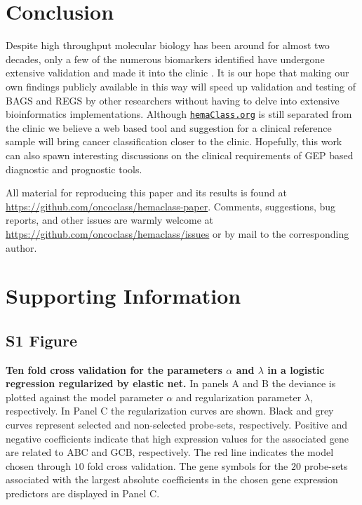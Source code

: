 \documentclass[10pt,letterpaper]{article}
\newcommand{\hemaClass}{\href{http://hemaClass.org}{\texttt{hemaClass.org}}}
\begin{document}
\section*{Conclusion}
Despite high throughput molecular biology has been around for almost two decades, only a few of the numerous biomarkers identified have undergone extensive validation and made it into the clinic \cite{Chen2012a}.
It is our hope that making our own findings publicly available in this way will speed up validation and testing of BAGS and REGS by other researchers without having to delve into extensive bioinformatics implementations.
Although \hemaClass{} is still separated from the clinic we believe a web based tool and suggestion for a clinical reference sample will bring cancer classification closer to the clinic.
Hopefully, this work can also spawn interesting discussions on the clinical requirements of GEP based diagnostic and prognostic tools.

All material for reproducing this paper and its results is found at \url{https://github.com/oncoclass/hemaclass-paper}.
Comments, suggestions, bug reports, and other issues are warmly welcome at \url{https://github.com/oncoclass/hemaclass/issues} or by mail to the corresponding author.

\section*{Supporting Information}

\setcounter{equation}{0}
\setcounter{figure}{0}
\setcounter{table}{0}

\renewcommand{\theequation}{S\arabic{equation}}
\renewcommand{\thefigure}{S\arabic{figure}}
\renewcommand{\thetable}{S\arabic{table}}
\renewcommand{\thesection}{S\arabic{section}}

\subsection*{S1 Figure}
\label{fig:crossval}
\textbf{Ten fold cross validation for the parameters $\alpha$ and $\lambda$ in a logistic regression regularized by elastic net.}
In panels A and B the deviance is plotted against the model parameter $\alpha$ and regularization parameter $\lambda$, respectively.
In Panel C the regularization curves are shown.
Black and grey curves represent selected and non-selected probe-sets, respectively.
Positive and negative coefficients indicate that high expression values for the associated gene are related to ABC and GCB, respectively.
The red line indicates the model chosen through $10$ fold cross validation.
The gene symbols for the $20$ probe-sets associated with the largest absolute coefficients in the chosen gene expression predictors are displayed in Panel C.
\end{document}
